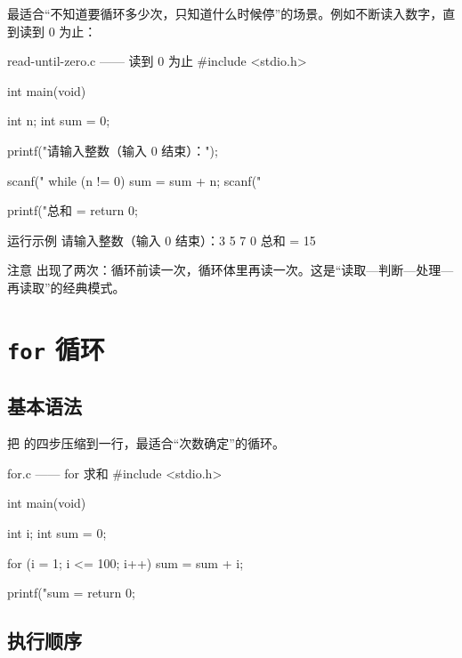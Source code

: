  最适合“不知道要循环多少次，只知道什么时候停”的场景。例如不断读入数字，直到读到 0 为止：

\begin{codebox}{read-until-zero.c —— 读到 0 为止}
#include <stdio.h>

int main(void)
{
    int n;
    int sum = 0;

    printf("请输入整数（输入 0 结束）：");

    scanf("%
    while (n != 0) {
        sum = sum + n;
        scanf("%
    }

    printf("总和 = %
    return 0;
}
\end{codebox}

\begin{outbox}{运行示例}
请输入整数（输入 0 结束）：3 5 7 0
总和 = 15
\end{outbox}

注意  出现了两次：循环前读一次，循环体里再读一次。这是“读取—判断—处理—再读取”的经典模式。

\section{\texttt{for} 循环}

\subsection{基本语法}

\begin{center}
\end{center}

 把  的四步压缩到一行，最适合“次数确定”的循环。

\begin{codebox}{for.c —— for 求和}
#include <stdio.h>

int main(void)
{
    int i;
    int sum = 0;

    for (i = 1; i <= 100; i++) {
        sum = sum + i;
    }

    printf("sum = %
    return 0;
}
\end{codebox}

\subsection{执行顺序}

